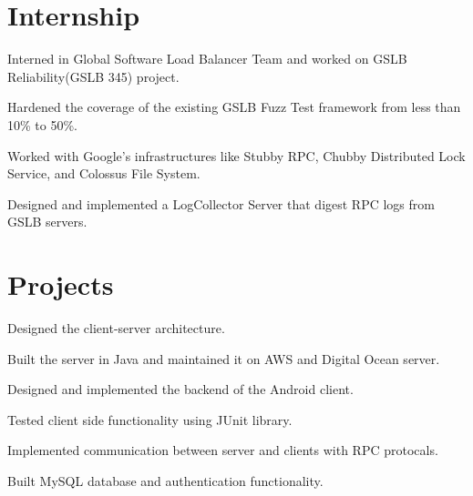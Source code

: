 \documentclass[]{deedy-resume-openfont}
\begin{document}
\vrule{}
\hfill
\begin{minipage}[t]{0.69\textwidth} 



\section{Internship}
\vspace{\topsep} %
\begin{tightemize}
	\item Interned in Global Software Load Balancer Team and worked on GSLB Reliability(GSLB 345) project.
	\item Hardened the coverage of the existing GSLB Fuzz Test framework from less than 10\% to 50\%.
	\item Worked with Google's infrastructures like Stubby RPC, Chubby Distributed Lock Service, and Colossus File System. 
	\item Designed and implemented a LogCollector Server that digest RPC logs from GSLB servers.
\end{tightemize}
\sectionsep

\section{Projects}

\begin{tightemize}
	\item Designed the client-server architecture.
	\item Built the server in Java and maintained it on AWS and Digital Ocean server.
	\item Designed and implemented the backend of the Android client.
	\item Tested client side functionality using JUnit library.
	\item Implemented communication between server and clients with RPC protocals.
	\item Built MySQL database and authentication functionality.
\end{tightemize}
\sectionsep


\end{minipage}
\end{document}
